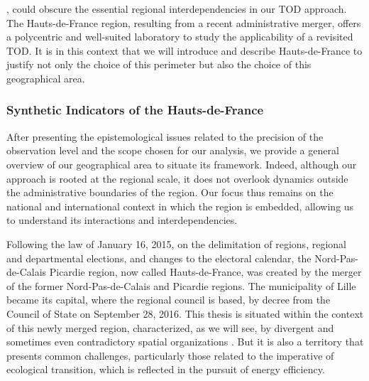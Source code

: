 \begin{refsegment}
{}, could obscure the essential regional interdependencies in our \acrshort{TOD} approach. The Hauts-de-France region, resulting from a recent administrative merger, offers a polycentric and well-suited laboratory to study the applicability of a revisited \acrshort{TOD}. It is in this context that we will introduce and describe Hauts-de-France to justify not only the choice of this perimeter but also the choice of this geographical area.%

\subsubsection*{Synthetic Indicators of the Hauts-de-France
    \label{chap3:region-hdf-situation}
    }

After presenting the epistemological issues related to the precision of the observation level and the scope chosen for our analysis, we provide a general overview of our geographical area to situate its framework. Indeed, although our approach is rooted at the regional scale, it does not overlook dynamics outside the administrative boundaries of the region. Our focus thus remains on the national and international context in which the region is embedded, allowing us to understand its interactions and interdependencies.%

Following the law of January 16, 2015, on the delimitation of regions, regional and departmental elections, and changes to the electoral calendar, the Nord-Pas-de-Calais Picardie region, now called Hauts-de-France, was created by the merger of the former Nord-Pas-de-Calais and Picardie regions. The municipality of Lille became its capital, where the regional council is based, by decree from the Council of State on September 28, 2016. This thesis is situated within the context of this newly merged region, characterized, as we will see, by divergent and sometimes even contradictory spatial organizations \textcolor{blue}{\autocite[170]{frotey_acteurs_2021}}. But it is also a territory that presents common challenges, particularly those related to the imperative of ecological transition, which is reflected in the pursuit of energy efficiency.%


\end{refsegment}
